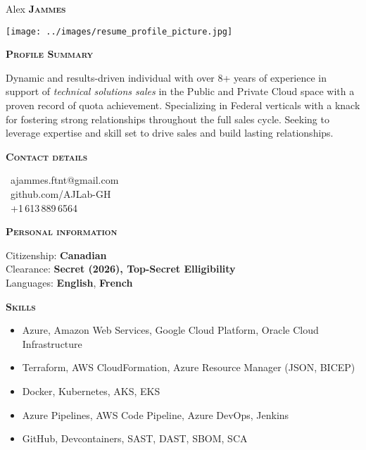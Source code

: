 \documentclass[11pt, a4paper]{article}
\newcommand{\headleft}[1]{\vspace*{3ex}\textsc{\textbf{#1}}\par%
    \vspace*{-1.5ex}\hrulefill\par\vspace*{0.7ex}}
\begin{document}
\setlength{\topskip}{0pt}
\setlength{\parindent}{0pt}
\setlength{\parskip}{0pt}
\setlength{\fboxsep}{0pt}
\pagestyle{empty}
\raggedbottom

\begin{minipage}[t]{0.28\textwidth} %
\colorbox{cvblue}{\begin{minipage}[t][5mm][t]{\textwidth}\null\hfill\null\end{minipage}}

\vspace{-.2ex} %
\colorbox{cvblue!90}{\color{white}  %
\textwidth\relax%
\begin{minipage}[t][293mm][t]{0.82\textwidth}
\raggedright
\vspace*{2.5ex}

\Large Alex \textbf{\textsc{Jammes}} \normalsize

\null\hfill\texttt{[image: ../images/resume\_profile\_picture.jpg]}\hfill\null

\vspace*{0.5ex} %

\headleft{Profile Summary}
Dynamic and results-driven individual with over 8+ years of experience in support of \textit{ technical solutions sales} in the Public and Private Cloud space with a proven record of quota achievement. Specializing in Federal verticals with a knack for fostering strong relationships throughout the full sales cycle. Seeking to leverage expertise and skill set to drive sales and build lasting relationships.

\headleft{Contact details}
\small %
\MVAt\ {\small ajammes.ftnt@gmail.com} \\[0.4ex]
\faGithub\ {\small github.com/AJLab-GH}\\[0.2ex]
\Mobilefone\ +1\,613\,889\,6564\,\\

\normalsize

\headleft{Personal information}
Citizenship: \textbf{Canadian} \\[0.5ex]
Clearance: \textbf{Secret (2026), Top-Secret Elligibility} \\[0.5ex]
Languages: \textbf{English}, \textbf{French}

\headleft{Skills}
\begin{itemize}
\item Azure, Amazon Web Services, Google Cloud Platform, Oracle Cloud Infrastructure
\item Terraform, AWS CloudFormation, Azure Resource Manager (JSON, BICEP)
\item Docker, Kubernetes, AKS, EKS
\item Azure Pipelines, AWS Code Pipeline, Azure DevOps, Jenkins
\item GitHub, Devcontainers, SAST, DAST, SBOM, SCA
\end{itemize}


\end{minipage}}
\end{minipage}
\end{document}

